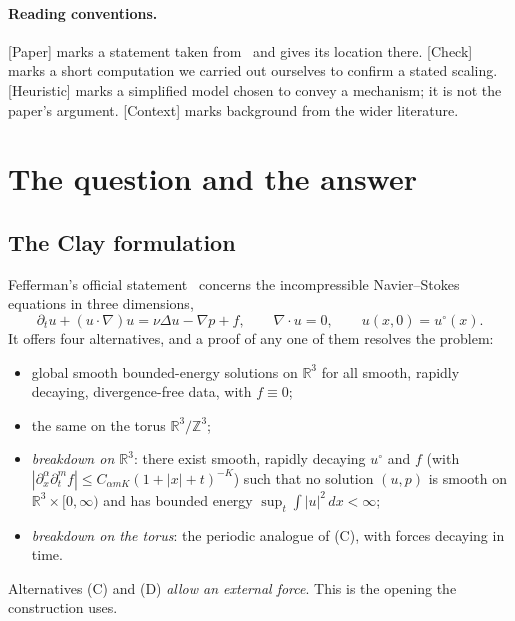 \documentclass[11pt]{article}
\newcommand{\R}{\mathbb{R}}
\theoremstyle{plain}
\theoremstyle{remark}
\newcommand{\paper}{\textsf{\small[Paper]}}
\newcommand{\chk}{\textsf{\small[Check]}}
\newcommand{\heur}{\textsf{\small[Heuristic]}}
\newcommand{\ctx}{\textsf{\small[Context]}}
\begin{document}
\paragraph{Reading conventions.} \paper{} marks a statement taken from~\cite{OAI} and gives its location there. \chk{} marks a short computation we carried out ourselves to confirm a stated scaling. \heur{} marks a simplified model chosen to convey a mechanism; it is not the paper's argument. \ctx{} marks background from the wider literature.

\tableofcontents

\section{The question and the answer}

\subsection{The Clay formulation}
Fefferman's official statement~\cite{Fef} concerns the incompressible Navier--Stokes equations in three dimensions,
\begin{equation}\label{eq:NS}
\partial_t u + (u\cdot\nabla)u = \nu\Delta u - \nabla p + f,\qquad \nabla\cdot u = 0,\qquad u(x,0)=u^\circ(x).
\end{equation}
It offers four alternatives, and a proof of any one of them resolves the problem:
\begin{itemize}[itemsep=1pt]
\item[(A)] global smooth bounded-energy solutions on $\R^3$ for all smooth, rapidly decaying, divergence-free data, with $f\equiv 0$;
\item[(B)] the same on the torus $\R^3/\mathbb Z^3$;
\item[(C)] \emph{breakdown on $\R^3$}: there exist smooth, rapidly decaying $u^\circ$ and $f$ (with $|\partial_x^\alpha\partial_t^m f|\le C_{\alpha mK}(1+|x|+t)^{-K}$) such that no solution $(u,p)$ is smooth on $\R^3\times[0,\infty)$ and has bounded energy $\sup_t\int|u|^2\,dx<\infty$;
\item[(D)] \emph{breakdown on the torus}: the periodic analogue of (C), with forces decaying in time.
\end{itemize}
Alternatives (C) and (D) \emph{allow an external force}. This is the opening the construction uses.
\end{document}
